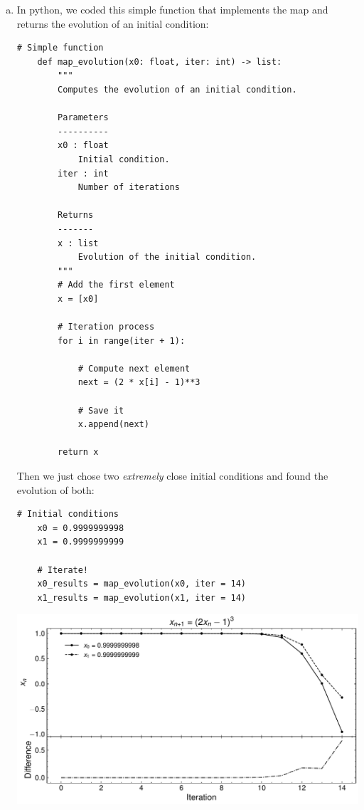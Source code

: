 \begin{enumerate}[(a)]
    \item In python, we coded this simple function that implements
    the map and returns the evolution of an initial condition:
    \begin{lstlisting}[style=pythonstyle]
    # Simple function
    def map_evolution(x0: float, iter: int) -> list:
        """
        Computes the evolution of an initial condition.

        Parameters
        ----------
        x0 : float
            Initial condition.
        iter : int
            Number of iterations

        Returns
        -------
        x : list
            Evolution of the initial condition.
        """
        # Add the first element
        x = [x0]

        # Iteration process
        for i in range(iter + 1):
            
            # Compute next element
            next = (2 * x[i] - 1)**3

            # Save it
            x.append(next)

        return x
    \end{lstlisting}

    Then we just chose two \textit{extremely} close initial conditions
    and found the evolution of both:
    \begin{lstlisting}[style=pythonstyle]
    # Initial conditions
    x0 = 0.9999999998
    x1 = 0.9999999999

    # Iterate!
    x0_results = map_evolution(x0, iter = 14)
    x1_results = map_evolution(x1, iter = 14)
    \end{lstlisting}

    \begin{center}
        \includegraphics[scale=0.7]{images/4a.pdf}
        \label{fig:4a}
    \end{center}


\end{enumerate}

